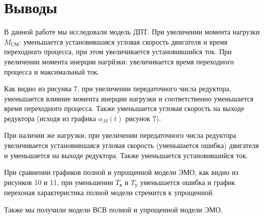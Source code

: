 \documentclass[a4paper, 12pt]{article}
\begin{document}
\section*{Выводы}
В данной работе мы исследовали модель ДПТ. При увеличении момента нагрузки $M_\text{СМ}$: уменьшается установившаяся угловая скорость двигателя и время переходного процесса, при этом увеличивается установившийся ток. При увеличении момента инерции нагрйзки: увеличивается время переходного процесса и максимальный ток. \par
Как видно из рисунка 7, при увеличении передаточного числа редуктора, уменьшается влияние момента инерции нагрузки и соответственно уменьшается время переходного процесса. Также уменьшается угловая скорость на выходе редуктора (исходя из графика $\alpha_M(t)$ рисунок 7). \par
При наличии же нагрузки, при увеличении передаточного числа редуктора увеличивается установившаяся угловая скорость (уменьшается ошибка) двигателя и уменьшается на выходе редуктора. Также уменьшается установившийся ток. \par
При сравнении графиков полной и упрощенной модели ЭМО, как видно из рисунков 10 и 11, при уменьшении $T_\text{я}$ и $T_\text{у}$ уменьшается ошибка и график перехоная характеристика полной модели стремится к упрощенной. \par
Также мы получили модели ВСВ полной и упрощенной модели ЭМО.
\end{document}
